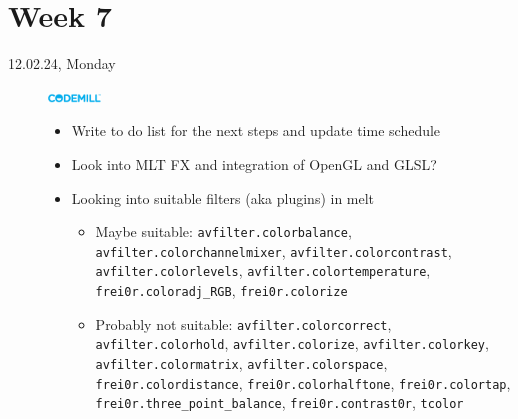 \documentclass[a4, 11pt]{scrartcl}
\begin{document}
	
	
	







\newpage
\section*{Week 7}	





\begin{description}
	
	
	
	
	
	\item[12.02.24, Monday]
	\includegraphics[width=1.4cm]{codemill.png}
	\begin{itemize}
		\item Write to do list for the next steps and update time schedule
		\item Look into MLT FX and integration of OpenGL and GLSL?
		\item Looking into suitable filters (aka plugins) in melt
		\begin{itemize}
			
			\item Maybe suitable: \texttt{avfilter.colorbalance}, \texttt{avfilter.colorchannelmixer}, \newline \texttt{avfilter.colorcontrast}, \texttt{avfilter.colorlevels}, \newline \texttt{avfilter.colortemperature}, \texttt{frei0r.coloradj\_RGB}, \texttt{frei0r.colorize}
			
			
			\item Probably not suitable: \texttt{avfilter.colorcorrect}, \texttt{avfilter.colorhold}, \newline \texttt{avfilter.colorize}, \texttt{avfilter.colorkey}, \texttt{avfilter.colormatrix}, \newline \texttt{avfilter.colorspace}, \texttt{frei0r.colordistance}, \texttt{frei0r.colorhalftone}, \newline  \texttt{frei0r.colortap}, \texttt{frei0r.three\_point\_balance}, \texttt{frei0r.contrast0r}, \texttt{tcolor}
			
		\end{itemize}
	\end{itemize}
	

\end{description}	
\end{document}
